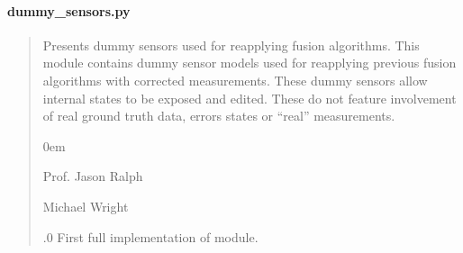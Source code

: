 \documentclass[letterpaper,10pt,english]{sphinxmanual}
\begin{document}
\paragraph{dummy\_sensors.py}
\label{\detokenize{modules/quantum/dummy:dummy-sensors-py}}\begin{quote}\begin{description}
\sphinxAtStartPar
Presents dummy sensors used for re\sphinxhyphen{}applying fusion algorithms.
This module contains dummy sensor models used for re\sphinxhyphen{}applying previous
fusion algorithms with corrected measurements. These dummy sensors allow
internal states to be exposed and edited. These do not feature involvement
of real ground truth data, errors states or “real” measurements.

\begin{DUlineblock}{0em}
\item[] Prof. Jason Ralph \sphinxhyphen{} 
\item[] Michael Wright \sphinxhyphen{} 
\end{DUlineblock}

.0 \sphinxhyphen{} First full implementation of module.

\end{description}\end{quote}
\end{document}
